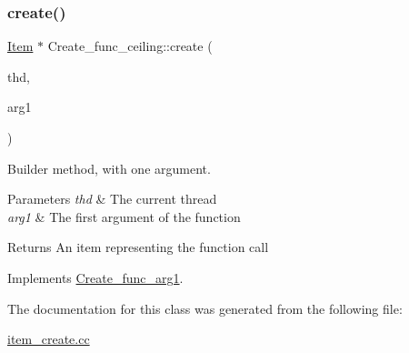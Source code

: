 \subsubsection{\texorpdfstring{create()}{create()}}
{\footnotesize\ttfamily \mbox{\hyperlink{classItem}{Item}} $\ast$ Create\+\_\+func\+\_\+ceiling\+::create (\begin{DoxyParamCaption}\item[{T\+HD $\ast$}]{thd,  }\item[{\mbox{\hyperlink{classItem}{Item}} $\ast$}]{arg1 }\end{DoxyParamCaption})\hspace{0.3cm}{\ttfamily [virtual]}}

Builder method, with one argument. 
\begin{DoxyParams}{Parameters}
{\em thd} & The current thread \\
\hline
{\em arg1} & The first argument of the function \\
\hline
\end{DoxyParams}
\begin{DoxyReturn}{Returns}
An item representing the function call 
\end{DoxyReturn}


Implements \mbox{\hyperlink{classCreate__func__arg1_a3e9a98f755cd82c3e762e334c955a8c9}{Create\+\_\+func\+\_\+arg1}}.



The documentation for this class was generated from the following file\+:\begin{DoxyCompactItemize}
\item 
\mbox{\hyperlink{item__create_8cc}{item\+\_\+create.\+cc}}\end{DoxyCompactItemize}
